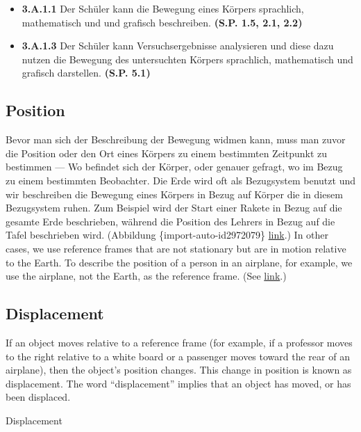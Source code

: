 \documentclass[
]{book}
\providecommand{\tightlist}{%
  \setlength{\itemsep}{0pt}\setlength{\parskip}{0pt}}
\begin{document}
\begin{itemize}
\tightlist
\item
  \textbf{3.A.1.1} Der Schüler kann die Bewegung eines Körpers sprachlich, mathematisch und und grafisch beschreiben.
  \textbf{(S.P. 1.5, 2.1, 2.2)}
\item
  \textbf{3.A.1.3} Der Schüler kann Versuchsergebnisse analysieren und diese dazu nutzen die Bewegung des untersuchten Körpers sprachlich, mathematisch und grafisch darstellen. \textbf{(S.P. 5.1)}
\end{itemize}

\hypertarget{fs-id3178358}{}
\hypertarget{position}{%
\subsection{Position}\label{position}}

Bevor man sich der Beschreibung der Bewegung widmen kann, muss man zuvor die {Position} oder den Ort eines Körpers zu einem bestimmten Zeitpunkt zu bestimmen --- Wo befindet sich der Körper, oder genauer gefragt, wo im Bezug zu einem bestimmten Beobachter. Die Erde wird oft als Bezugsystem benutzt und wir beschreiben die Bewegung eines Körpers in Bezug auf Körper die in diesem Bezugsystem ruhen. Zum Beispiel wird der Start einer Rakete in Bezug auf die gesamte Erde beschrieben, während die Position des Lehrers in Bezug auf die Tafel beschrieben wird. (Abbildung
\citet{ref}\{import-auto-id2972079\} \protect\hyperlink{import-auto-id2972079}{link}.) In other cases,
we use reference frames that are not stationary but are in motion
relative to the Earth. To describe the position of a person in an
airplane, for example, we use the airplane, not the Earth, as the
reference frame. (See
\protect\hyperlink{import-auto-id2707699}{link}.)

\hypertarget{fs-id2572460}{}
\hypertarget{displacement-1}{%
\subsection{Displacement}\label{displacement-1}}

If an object moves relative to a reference frame (for example, if a
professor moves to the right relative to a white board or a passenger
moves toward the rear of an airplane), then the object's position
changes. This change in position is known as
{displacement}. The word ``displacement'' implies that
an object has moved, or has been displaced.

\hypertarget{fs-id3206000}{}
Displacement
\end{document}
